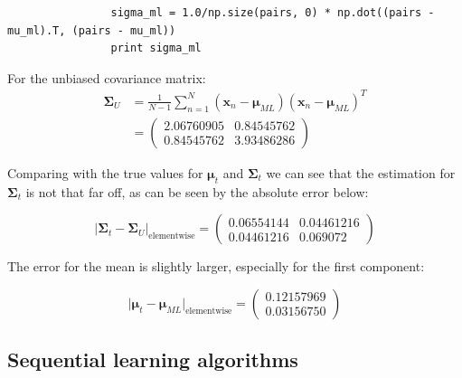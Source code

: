 \documentclass[paper=a4, fontsize=10pt]{scrartcl} %
\numberwithin{equation}{section} %
\numberwithin{figure}{section} %
\numberwithin{table}{section} %
\begin{document}
\begin{enumerate}
\begin{verbatim}
				sigma_ml = 1.0/np.size(pairs, 0) * np.dot((pairs - mu_ml).T, (pairs - mu_ml))
				print sigma_ml
			\end{verbatim}

			For the unbiased covariance matrix:
			\begin{align}
				\boldsymbol \Sigma_U &= \frac{1}{N-1} \sum_{n=1}^N (\boldsymbol x_n - \boldsymbol \mu_{ML})(\boldsymbol x_n - \boldsymbol\mu_{ML})^T\\
				&= \begin{pmatrix} 2.06760905 & 0.84545762 \\ 0.84545762 & 3.93486286 \end{pmatrix}
			\end{align}

			Comparing with the true values for $\boldsymbol\mu_t$ and $\boldsymbol\Sigma_t$ we can see that the estimation for $\boldsymbol\Sigma_t$ is not that far off, as can be seen by the absolute error below:

			\begin{equation}
				\vert \boldsymbol\Sigma_t - \boldsymbol\Sigma_U \vert_{\text{elementwise}} =
				\begin{pmatrix}
					0.06554144 & 0.04461216 \\
					0.04461216 & 0.069072 
				\end{pmatrix}
			\end{equation}

			The error for the mean is slightly larger, especially for the first component:

			\begin{equation}
				\vert \boldsymbol\mu_t - \boldsymbol\mu_{ML} \vert_{\text{elementwise}} =
				\begin{pmatrix}
					0.12157969 \\
					0.03156750
				\end{pmatrix}
			\end{equation}
\end{enumerate}

\subsection{Sequential learning algorithms}
\end{document}

